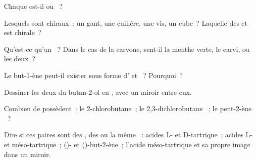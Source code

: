 \begin{exercise}[$\star$]\label{exo:g12:stereochemistry:2}
Chaque  est-il  ou ~?
\begin{center}
 \qquad
{}
\end{center}
\end{exercise}

\begin{exercise}[$\star$]\label{exo:g12:stereochemistry:3}
Lesquels sont chiraux~: un gant, une cuillère, une vis, un cube~?
Laquelle des   et  est chirale~?
\end{exercise}

\begin{exercise}[$\star$]\label{exo:g12:stereochemistry:4}
Qu'est-ce qu'un ~? Dans le cas de la carvone, sent-il
la menthe verte, le carvi, ou les deux~?
\end{exercise}

\begin{exercise}[$\star$]\label{exo:g12:stereochemistry:5}
Le but-1-ène  peut-il exister sous forme d'
et ~? Pourquoi~?
\end{exercise}

\begin{exercise}[$\star\star$]\label{exo:g12:stereochemistry:6}
Dessiner les deux  du butan-2-ol en ,
avec un miroir entre eux.
\end{exercise}

\begin{exercise}[$\star\star$]\label{exo:g12:stereochemistry:7}
Combien de  possèdent~: le 2-chlorobutane~; le
2,3-dichlorobutane ~; le pent-2-ène
~?
\end{exercise}

\begin{exercise}[$\star\star$]\label{exo:g12:stereochemistry:8}
Dire si ces paires sont des , des  ou la
même ~: acides L- et D-tartrique~; acides L- et méso-tartrique~;
()- et ()-but-2-ène~; l'acide méso-tartrique et sa propre image dans
un miroir.
\end{exercise}

